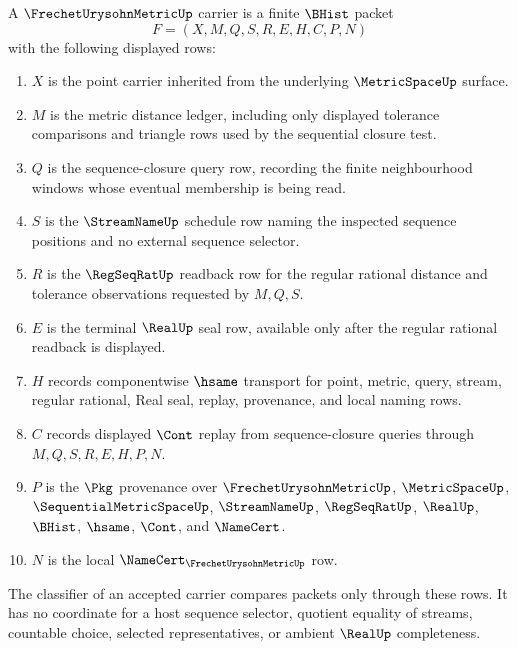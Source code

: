 \begin{definition}
\label{def:frechet-urysohn-metric-carrier}
A $\FrechetUrysohnMetricUp$ carrier is a finite $\BHist$ packet
$$
F=(X,M,Q,S,R,E,H,C,P,N)
$$
with the following displayed rows:
\begin{enumerate}
\item $X$ is the point carrier inherited from the underlying $\MetricSpaceUp$ surface.
\item $M$ is the metric distance ledger, including only displayed tolerance comparisons and triangle rows used by the sequential closure test.
\item $Q$ is the sequence-closure query row, recording the finite neighbourhood windows whose eventual membership is being read.
\item $S$ is the $\StreamNameUp$ schedule row naming the inspected sequence positions and no external sequence selector.
\item $R$ is the $\RegSeqRatUp$ readback row for the regular rational distance and tolerance observations requested by $M,Q,S$.
\item $E$ is the terminal $\RealUp$ seal row, available only after the regular rational readback is displayed.
\item $H$ records componentwise $\hsame$ transport for point, metric, query, stream, regular rational, Real seal, replay, provenance, and local naming rows.
\item $C$ records displayed $\Cont$ replay from sequence-closure queries through $M,Q,S,R,E,H,P,N$.
\item $P$ is the $\Pkg$ provenance over $\FrechetUrysohnMetricUp$, $\MetricSpaceUp$, $\SequentialMetricSpaceUp$, $\StreamNameUp$, $\RegSeqRatUp$, $\RealUp$, $\BHist$, $\hsame$, $\Cont$, and $\NameCert$.
\item $N$ is the local $\NameCert_{\FrechetUrysohnMetricUp}$ row.
\end{enumerate}
The classifier of an accepted carrier compares packets only through these rows. It has no coordinate for a host sequence selector, quotient equality of streams, countable choice, selected representatives, or ambient $\RealUp$ completeness.
\end{definition}

